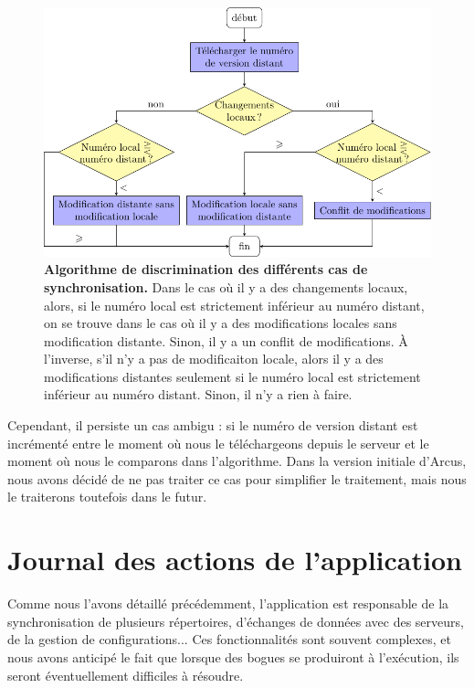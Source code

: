 \begin{figure}[h]
    \centering
    \includegraphics{figures/sync-discr}
    \caption{\textbf{Algorithme de discrimination des différents cas de synchronisation.} Dans le cas où il y a des changements locaux, alors, si le numéro local est strictement inférieur au numéro distant, on se trouve dans le cas où il y a des modifications locales sans modification distante. Sinon, il y a un conflit de modifications. À l'inverse, s'il n'y a pas de modificaiton locale, alors il y a des modifications distantes seulement si le numéro local est strictement inférieur au numéro  distant. Sinon, il n'y a rien à faire.}
    \label{fig:conception-sync-discr}
\end{figure}

Cependant, il persiste un cas ambigu : si le numéro de version distant est incrémenté entre le moment où nous le téléchargeons depuis le serveur et le moment où nous le comparons dans l'algorithme. Dans la version initiale d'Arcus, nous avons décidé de ne pas traiter ce cas pour simplifier le traitement, mais nous le traiterons toutefois dans le futur.

\section{Journal des actions de l'application}

Comme nous l'avons détaillé précédemment, l'application est responsable de la synchronisation de plusieurs répertoires, d'échanges de données avec des serveurs, de la gestion de configurations... Ces fonctionnalités sont souvent complexes, et nous avons anticipé le fait que lorsque des bogues se produiront à l'exécution, ils seront éventuellement difficiles à résoudre.

